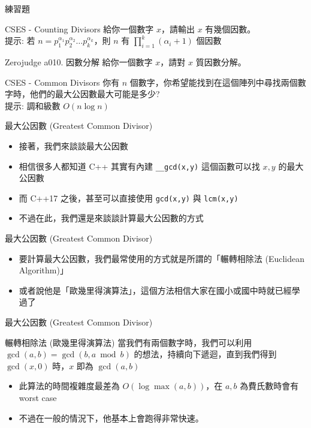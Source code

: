 \documentclass[aspectratio=169]{beamer}
\begin{document}
\begin{frame}{練習題}
    \begin{block}{CSES - Counting Divisors}
        給你一個數字 $x$，請輸出 $x$ 有幾個因數。\\
        \vspace{5mm}
        提示: 若 $n=p_1^{\alpha_1} p_2^{\alpha_2} \dots p_k^{\alpha_k}$，則 $n$ 有 $\prod_{i=1}^k (\alpha_i+1)$ 個因數
    \end{block}
    \begin{block}{Zerojudge a010. 因數分解}
        給你一個數字 $x$，請對 $x$ 質因數分解。
    \end{block}
    \begin{block}{CSES - Common Divisors}
        你有 $n$ 個數字，你希望能找到在這個陣列中尋找兩個數字時，他們的最大公因數最大可能是多少?\\
        \vspace{5mm}
        提示: 調和級數 $O(n \log n)$
    \end{block}
\end{frame}

\begin{frame}{最大公因數 (Greatest Common Divisor)}
     \begin{itemize}
         \item<1-> 接著，我們來談談最大公因數
         \item<2-> 相信很多人都知道 C++ 其實有內建 \texttt{\_\_gcd(x,y)} 這個函數可以找 $x,y$ 的最大公因數
         \item<2-> 而 C++17 之後，甚至可以直接使用 \texttt{gcd(x,y)} 與 \texttt{lcm(x,y)}
         \item<3-> 不過在此，我們還是來談談計算最大公因數的方式
     \end{itemize}
\end{frame}

\begin{frame}{最大公因數 (Greatest Common Divisor)}
     \begin{itemize}
         \item<1-> 要計算最大公因數，我們最常使用的方式就是所謂的「輾轉相除法 (Euclidean Algorithm)」
         \item<1-> 或者說他是「歐幾里得演算法」，這個方法相信大家在國小或國中時就已經學過了
     \end{itemize}
\end{frame}

\begin{frame}{最大公因數 (Greatest Common Divisor)}
    \begin{alertblock}{輾轉相除法 (歐幾里得演算法)}
        當我們有兩個數字時，我們可以利用 $\gcd(a,b) = \gcd(b,a \bmod b)$ 的想法，持續向下遞迴，直到我們得到 $\gcd(x,0)$ 時，$x$ 即為 $\gcd(a,b)$
    \end{alertblock} 
    \begin{itemize}
        \item 此算法的時間複雜度最差為 $O(\log \max(a,b))$，在 $a,b$ 為費氏數時會有 worst case
        \item 不過在一般的情況下，他基本上會跑得非常快速。
    \end{itemize}
\end{frame}
\end{document}
